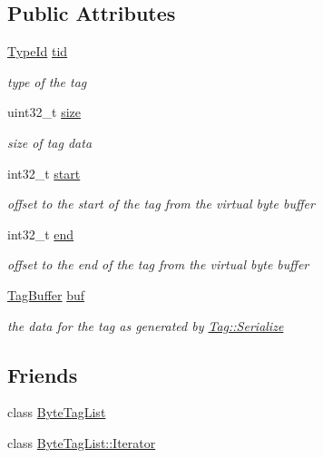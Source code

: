 \subsection*{Public Attributes}
\begin{DoxyCompactItemize}
\item 
\hyperlink{classns3_1_1TypeId}{Type\+Id} \hyperlink{structns3_1_1ByteTagList_1_1Iterator_1_1Item_a0b2c2b02b42bdb44e5e30957326fa9c4}{tid}
\begin{DoxyCompactList}\small\item\em type of the tag \end{DoxyCompactList}\item 
uint32\+\_\+t \hyperlink{structns3_1_1ByteTagList_1_1Iterator_1_1Item_ab3278260cd4f3122af13ce4709593300}{size}
\begin{DoxyCompactList}\small\item\em size of tag data \end{DoxyCompactList}\item 
int32\+\_\+t \hyperlink{structns3_1_1ByteTagList_1_1Iterator_1_1Item_aef2285f6a160392d3deef04011ef2d71}{start}
\begin{DoxyCompactList}\small\item\em offset to the start of the tag from the virtual byte buffer \end{DoxyCompactList}\item 
int32\+\_\+t \hyperlink{structns3_1_1ByteTagList_1_1Iterator_1_1Item_ac1467ce68914a35f23f9ad9c15f6b6d8}{end}
\begin{DoxyCompactList}\small\item\em offset to the end of the tag from the virtual byte buffer \end{DoxyCompactList}\item 
\hyperlink{classns3_1_1TagBuffer}{Tag\+Buffer} \hyperlink{structns3_1_1ByteTagList_1_1Iterator_1_1Item_aafaf58854685aec641de85ebeef5be1d}{buf}
\begin{DoxyCompactList}\small\item\em the data for the tag as generated by \hyperlink{classns3_1_1Tag_ac9aa7c4f923da5d2c82de94690101dc3}{Tag\+::\+Serialize} \end{DoxyCompactList}\end{DoxyCompactItemize}
\subsection*{Friends}
\begin{DoxyCompactItemize}
\item 
class \hyperlink{structns3_1_1ByteTagList_1_1Iterator_1_1Item_a638c63b97c2e0e6a3bea307fe39c6093}{Byte\+Tag\+List}
\item 
class \hyperlink{structns3_1_1ByteTagList_1_1Iterator_1_1Item_ab6c5354037c9fb5c6afeaa75f2f639e8}{Byte\+Tag\+List\+::\+Iterator}
\end{DoxyCompactItemize}


